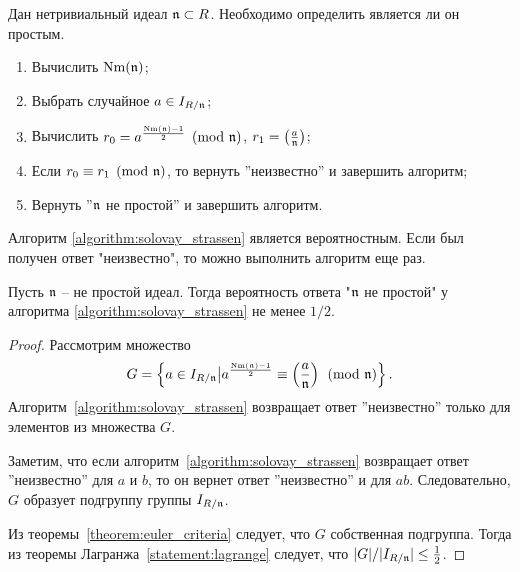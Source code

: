 \documentclass[_00_dissertation.tex]{subfiles}
\begin{document}
\begin{algorithm}\label{algorithm:solovay_strassen}
    Дан нетривиальный идеал $\mathfrak{n} \subset R$.
    Необходимо определить является ли он простым.

    \begin{enumerate}
        \item Вычислить $\textrm{Nm}(\mathfrak{n})$;
        
        \item Выбрать случайное $a \in I_{R/\mathfrak{n}}$;

        \item Вычислить $r_0 = a^{\frac{\textrm{Nm}(\mathfrak{n}) - 1}{2}} \pmod{\mathfrak{n}}$, $r_1 = \left(\frac{a}{\mathfrak{n}}\right)$;

        \item Если $r_0 \equiv r_1 \pmod{\mathfrak{n}}$, то вернуть ''неизвестно'' и завершить алгоритм;

        \item Вернуть ''$\mathfrak{n}$ не простой'' и завершить алгоритм.
    \end{enumerate}
\end{algorithm}

\begin{remark}
    Алгоритм \ref{algorithm:solovay_strassen} является вероятностным.
    Если был получен ответ "неизвестно", то можно выполнить алгоритм еще раз.
\end{remark}

\begin{proposition}
    Пусть $\mathfrak{n}$ -- не простой идеал.
    Тогда вероятность ответа "$\mathfrak{n}$ не простой" у алгоритма \ref{algorithm:solovay_strassen} не менее $1/2$.
\end{proposition}
\begin{proof}
    Рассмотрим множество
    \begin{equation*}
        G = \left\{
            a \in I_{R/\mathfrak{n}} \big| a^{\frac{\textrm{Nm}(\mathfrak{n}) - 1}{2}} \equiv \left(\frac{a}{\mathfrak{n}}\right) \pmod{\mathfrak{n}}
        \right\}.
    \end{equation*}
    Алгоритм~\ref{algorithm:solovay_strassen} возвращает ответ ''неизвестно'' только для элементов из множества $G$.

    Заметим, что если алгоритм~\ref{algorithm:solovay_strassen} возвращает ответ ''неизвестно'' для $a$ и $b$, то он вернет ответ ''неизвестно'' и для $ab$.
    Следовательно, $G$ образует подгруппу группы $I_{R/\mathfrak{n}}$.

    Из теоремы~\ref{theorem:euler_criteria} следует, что $G$ собственная подгруппа.
    Тогда из теоремы Лагранжа~\ref{statement:lagrange} следует, что $|G|/|I_{R/\mathfrak{n}}| \le \frac{1}{2}$.
\end{proof}
\end{document}
